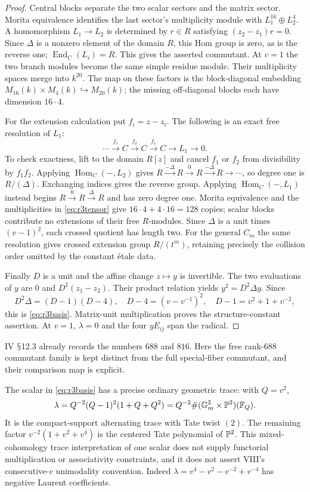 \documentclass[11pt,a4paper]{article}
\newcommand{\Hom}{\operatorname{Hom}}\newcommand{\Spec}{\operatorname{Spec}}\newcommand{\Tr}{\operatorname{Tr}}\newcommand{\rank}{\operatorname{rank}}\newcommand{\Sym}{\operatorname{Sym}}\newcommand{\Res}{\operatorname{Res}}\newcommand{\IC}{\operatorname{IC}}\newcommand{\Gr}{\operatorname{Gr}}\newcommand{\Rep}{\operatorname{Rep}}\newcommand{\Frob}{\operatorname{Frob}}\newcommand{\End}{\operatorname{End}}
\renewcommand{\S}{\ensuremath{\mathsection}}
\theoremstyle{named}\newtheorem{finding}{Finding}[section]
\theoremstyle{definition}\newtheorem{definition}[finding]{Definition}
\theoremstyle{remark}\newtheorem{remark}[finding]{Remark}
\begin{document}
\begin{proof}
Central blocks separate the two scalar sectors and the matrix sector.
Morita equivalence identifies the last sector's multiplicity module
with $L_1^{16}\oplus L_2^4$. A homomorphism $L_1\to L_2$ is determined
by $r\in R$ satisfying $(z_2-z_1)r=0$. Since $\Delta$ is a nonzero
element of the domain $R$, this Hom group is zero, as is the reverse
one; $\End_C(L_i)=R$. This gives the asserted commutant. At $v=1$ the
two branch modules become the same simple residue module. Their
multiplicity spaces merge into $k^{20}$. The map on these factors is
the block-diagonal embedding $M_{16}(k)\times M_4(k)\hookrightarrow
M_{20}(k)$; the missing off-diagonal blocks each have dimension $16\cdot4$.

For the extension calculation put $f_i=z-z_i$. The following is an
exact free resolution of $L_1$:
\[
 \cdots\xrightarrow{f_1}C\xrightarrow{f_2}C
             \xrightarrow{f_1}C\longrightarrow L_1\longrightarrow0.
\]
To check exactness, lift to the domain $R[z]$ and cancel $f_1$ or $f_2$
from divisibility by $f_1f_2$. Applying $\Hom_C(-,L_2)$ gives
$R\xrightarrow{-\Delta}R\xrightarrow0R\xrightarrow{-\Delta}R\to\cdots$,
so degree one is $R/(\Delta)$. Exchanging indices gives the reverse
group. Applying $\Hom_C(-,L_1)$ instead begins
$R\xrightarrow0R\xrightarrow\Delta R$ and has zero degree one.
Morita equivalence and the multiplicities in \eqref{eq:r3tensor} give
$16\cdot4+4\cdot16=128$ copies; scalar blocks contribute no extensions
of their free $R$-modules. Since $\Delta$ is a unit times $(v-1)^2$,
each crossed quotient has length two. For the general $C_m$ the same
resolution gives crossed extension group $R/(t^m)$, retaining precisely
the collision order omitted by the constant \'etale data.

Finally $D$ is a unit and the affine change $z\mapsto y$ is invertible.
The two evaluations of $y$ are $0$ and $D^2(z_1-z_2)$. Their product
relation yields $y^2=D^2\Delta y$. Since
\[
 D^2\Delta=(D-1)(D-4),\quad
 D-4=(v-v^{-1})^2,\quad D-1=v^2+1+v^{-2},
\]
this is \eqref{eq:r3basis}. Matrix-unit multiplication proves the
structure-constant assertion. At $v=1$, $\lambda=0$ and the four
$yE_{ij}$ span the radical.
\end{proof}
IV \S12.3 already records the numbers $688$ and $816$. Here the free
rank-$688$ commutant family is kept distinct from the full
special-fiber commutant, and their comparison map is explicit.

The scalar in \eqref{eq:r3basis} has a precise ordinary geometric trace:
with $Q=v^2$,
\[
 \lambda=Q^{-2}(Q-1)^2(1+Q+Q^2)
       =Q^{-2}\#(\mathbb G_m^2\times\mathbb P^2)(\mathbb F_Q).
\]
It is the compact-support alternating trace with Tate twist $(2)$.
The remaining factor $v^{-2}(1+v^2+v^4)$ is the centered Tate polynomial
of $\mathbb P^2$. This mixed-cohomology trace interpretation of one scalar
does not supply functorial multiplication or associativity constraints,
and it does not assert VIII's consecutive-$v$ unimodality convention.
Indeed $\lambda=v^4-v^2-v^{-2}+v^{-4}$ has negative Laurent coefficients.
\end{document}
